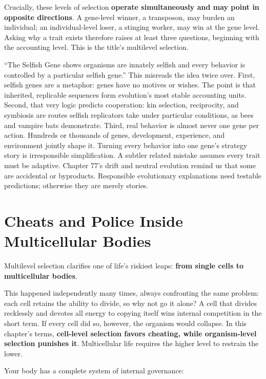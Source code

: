 Crucially, these levels of selection \textbf{operate simultaneously and may point in opposite directions}. A gene-level winner, a transposon, may burden an individual; an individual-level loser, a stinging worker, may win at the gene level. Asking why a trait exists therefore raises at least three questions, beginning with the accounting level. This is the title's multilevel selection.

\begin{wuqu}
``The Selfish Gene shows organisms are innately selfish and every behavior is controlled by a particular selfish gene.'' This misreads the idea twice over. First, selfish genes are a metaphor: genes have no motives or wishes. The point is that inherited, replicable sequences form evolution's most stable accounting units. Second, that very logic predicts cooperation: kin selection, reciprocity, and symbiosis are routes selfish replicators take under particular conditions, as bees and vampire bats demonstrate. Third, real behavior is almost never one gene per action. Hundreds or thousands of genes, development, experience, and environment jointly shape it. Turning every behavior into one gene's strategy story is irresponsible simplification. A subtler related mistake assumes every trait must be adaptive. Chapter 77's drift and neutral evolution remind us that some are accidental or byproducts. Responsible evolutionary explanations need testable predictions; otherwise they are merely stories.
\end{wuqu}

\section{Cheats and Police Inside Multicellular Bodies}

Multilevel selection clarifies one of life's riskiest leaps: \textbf{from single cells to multicellular bodies}.

This happened independently many times, always confronting the same problem: each cell retains the ability to divide, so why not go it alone? A cell that divides recklessly and devotes all energy to copying itself wins internal competition in the short term. If every cell did so, however, the organism would collapse. In this chapter's terms, \textbf{cell-level selection favors cheating, while organism-level selection punishes it}. Multicellular life requires the higher level to restrain the lower.

Your body has a complete system of internal governance:

